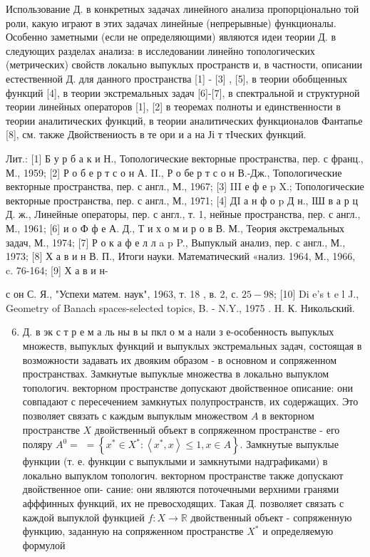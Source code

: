 \documentclass[10pt]{article}
\begin{document}
Использование Д. в конкретных задачах линейного анализа пропорціонально той роли, какую играют в этих задачах линейные (непрерывные) функционалы. Особенно заметными (если не определяющими) являются идеи теории Д. в следующих разделах анализа: в исследовании линейно топологических (метрических) свойств локально выпуклых пространств и, в частности, описании естественной Д. для данного пространства [1] - [3] , [5], в теории обобщенных функций [4], в теории экстремальных задач [6]-[7], в спектральной и структурной теории линейных операторов [1], [2] в теоремах полноты и единственности в теории аналитических функций, в теории аналитических функционалов Фантапье [8], см. также Двойствениость в те ори и а на Јі т тІческих функций.



Лит.: [1] Б у р б а к и Н., Топологические векторные пространства, пер. с франц., М., 1959; [2] Р о б е р т с о н А. II., Р о бе р т с о н В.-Дж., Топологические векторные пространства, пер. с англ., М., 1967; [3] III е ф е p X.; Топологические векторные пространства, пер. с англ., М., 1971; [4] ДI а н ф о p Д н., ІШ в а р ц Д. ж., Линейные операторы, пер. с англ., т. 1, нейные пространства, пер. с англ., М., 1961; [6] и о Ф ф е А. Д., Т и х о м и р о в В. М., Теория әкстремальных задач, М., 1974; [7] Р о к а ф е л л a p P., Выпуклый анализ, пер. с англ., М., 1973; [8] Х а в и н В. П., Итоги науки. Математический «нализ. 1964, М., 1966, c. 76-164; [9] Х а в и н-

с он С. Я., "Успехи матем. наук", 1963, т. 18 , в. 2, с. $25-98$; [10] Di e's t e l J., Geometry of Banach spaces-selected topics, B. - N.Y., 1975 . H. К. Никольский.



\begin{enumerate}

  \setcounter{enumi}{5}

  \item Д. в эк с т р е м а ль ны в ы пкл о м а нали з е-особенность выпуклых множеств, выпуклых функций и выпуклых экстремальных задач, состоящая в возможности задавать их двояким образом - в основном и сопряженном пространствах. Замкнутые выпуклые множества в локально выпуклом топологич. векторном пространстве допускают двойственное описание: они совпадают с пересечением замкнутых полупространств, их содержащих. Это позволяет связать с каждым выпуклым множеством $A$ в векторном пространстве $X$ двойственный объект в сопряженном пространстве - его поляру $A^{0}=$ $=\left\{x^{*} \in X^{*}:\left\langle x^{*}, x\right\rangle \leqslant 1, x \in A\right\}$. Замкнутые выпуклые функции (т. е. функции с выпуклыми и замкнутыми надграфиками) в локально выпуклом топологич. векторном пространстве также допускают двойственное опи- сание: они являются поточечными верхними гранями афффинных функций, их не превосходящих. Такая Д. позволяет связать с каждой выпуклой функцией $f: X \rightarrow \mathbb{R}$ двойственный объект - сопряженную функцию, заданную на сопряженном пространстве $X^{*}$ и определяемую формулой

\end{enumerate}
\end{document}
